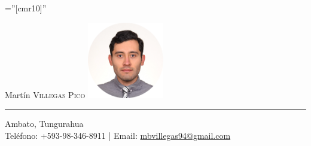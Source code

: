 \documentclass[a4paper,10.9pt]{article}
\begin{document}
  




\font\fb=''[cmr10]'' %


{ \Huge Martín \textsc{Villegas Pico}}\hfill
\includegraphics[width=9em]{img/rounded.png} \\
\textcolor{black!30}{\rule[.1\baselineskip]{\textwidth}{1pt}}

\begin{center}
Ambato, Tungurahua\\
Teléfono: +593-98-346-8911 | Email: \href{mailto:mbvillegas94@gmail.com}{mbvillegas94@gmail.com}
\end{center}


%
\end{document}
